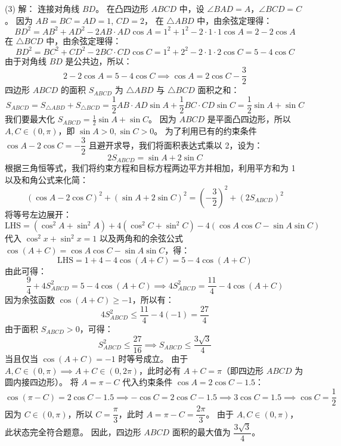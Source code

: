 {  (3) 解：
  连接对角线 \(BD\)。
  在凸四边形 \(ABCD\) 中，设 \(\angle BAD = A\)，\(\angle BCD = C\)。
  因为 \(AB = BC = AD = 1\), \(CD = 2\)，
  在 \(\triangle ABD\) 中，由余弦定理得：
  \[ BD^2 = AB^2 + AD^2 - 2AB \cdot AD \cos A = 1^2 + 1^2 - 2 \cdot 1 \cdot 1 \cos A = 2 - 2\cos A \]
  在 \(\triangle BCD\) 中，由余弦定理得：
  \[ BD^2 = BC^2 + CD^2 - 2BC \cdot CD \cos C = 1^2 + 2^2 - 2 \cdot 1 \cdot 2 \cos C = 5 - 4\cos C \]
  由于对角线 \(BD\) 是公共边，所以：
  \[ 2 - 2\cos A = 5 - 4\cos C \implies \cos A = 2\cos C - \frac{3}{2} \]
  四边形 \(ABCD\) 的面积 \(S_{ABCD}\) 为 \(\triangle ABD\) 与 \(\triangle BCD\) 面积之和：
  \[ S_{ABCD} = S_{\triangle ABD} + S_{\triangle BCD} = \frac{1}{2}AB \cdot AD \sin A + \frac{1}{2}BC \cdot CD \sin C = \frac{1}{2}\sin A + \sin C \]
  我们要最大化 \(S_{ABCD} = \frac{1}{2}\sin A + \sin C\)。
  因为 \(ABCD\) 是平面凸四边形，所以 \(A, C \in (0, \pi)\)，即 \(\sin A > 0, \sin C > 0\)。
  为了利用已有的约束条件 \(\cos A - 2\cos C = -\dfrac{3}{2}\) 且避开求导，我们将面积表达式乘以 2，设为：
  \[ 2S_{ABCD} = \sin A + 2\sin C \]
  根据三角恒等式，我们将约束方程和目标方程两边平方并相加，利用平方和为 1 以及和角公式来化简：
  \[ (\cos A - 2\cos C)^2 + (\sin A + 2\sin C)^2 = \left(-\frac{3}{2}\right)^2 + (2S_{ABCD})^2 \]
  将等号左边展开：
  \[ \text{LHS} = (\cos^2 A + \sin^2 A) + 4(\cos^2 C + \sin^2 C) - 4(\cos A\cos C - \sin A\sin C) \]
  代入 \(\cos^2 x + \sin^2 x = 1\) 以及两角和的余弦公式 \(\cos(A+C) = \cos A\cos C - \sin A\sin C\)，得：
  \[ \text{LHS} = 1 + 4 - 4\cos(A+C) = 5 - 4\cos(A+C) \]
  由此可得：
  \[ \frac{9}{4} + 4S_{ABCD}^2 = 5 - 4\cos(A+C) \implies 4S_{ABCD}^2 = \frac{11}{4} - 4\cos(A+C) \]
  因为余弦函数 \(\cos(A+C) \ge -1\)，所以有：
  \[ 4S_{ABCD}^2 \le \frac{11}{4} - 4(-1) = \frac{27}{4} \]
  由于面积 \(S_{ABCD} > 0\)，可得：
  \[ S_{ABCD}^2 \le \frac{27}{16} \implies S_{ABCD} \le \frac{3\sqrt{3}}{4} \]
  当且仅当 \(\cos(A+C) = -1\) 时等号成立。
  由于 \(A, C \in (0, \pi) \implies A+C \in (0, 2\pi)\)，此时必有 \(A + C = \pi\)（即四边形 \(ABCD\) 为圆内接四边形）。
  将 \(A = \pi - C\) 代入约束条件 \(\cos A = 2\cos C - 1.5\)：
  \[ \cos(\pi - C) = 2\cos C - 1.5 \implies -\cos C = 2\cos C - 1.5 \implies 3\cos C = 1.5 \implies \cos C = \frac{1}{2} \]
  因为 \(C \in (0, \pi)\)，所以 \(C = \dfrac{\pi}{3}\)，此时 \(A = \pi - C = \dfrac{2\pi}{3}\)。
  由于 \(A, C \in (0, \pi)\)，此状态完全符合题意。
  因此，四边形 \(ABCD\) 面积的最大值为 \(\dfrac{3\sqrt{3}}{4}\)。%
}
